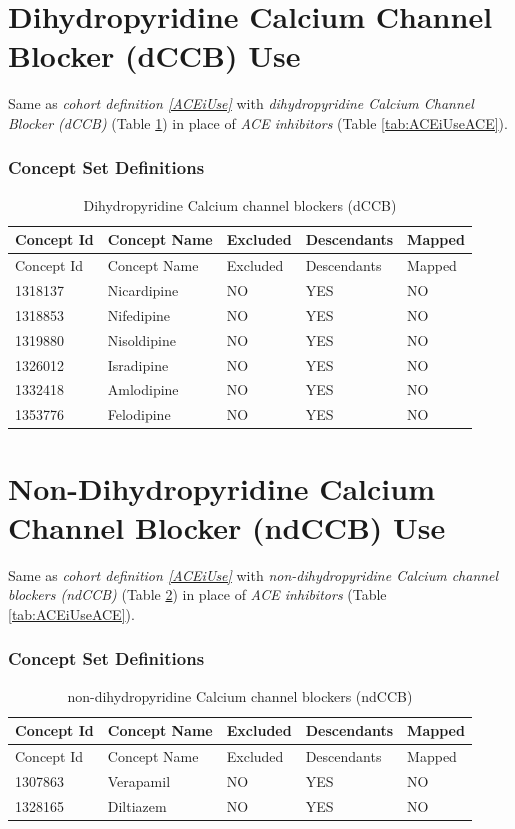 \documentclass[10.5pt]{book}
\theoremstyle{definition}
\theoremstyle{definition}
\theoremstyle{definition}
\theoremstyle{remark}
\begin{document}
\section{Dihydropyridine Calcium Channel Blocker (dCCB)
Use}\label{dCCBUse}

Same as \emph{cohort definition \ref{ACEiUse}} with
\emph{dihydropyridine Calcium Channel Blocker (dCCB)} (Table
\ref{tab:dCCBUsedCBB}) in place of \emph{ACE inhibitors} (Table
\ref{tab:ACEiUseACE}).

\subsubsection*{Concept Set
Definitions}\label{concept-set-definitions-9}

\begin{longtable}[]{@{}lllll@{}}
\caption{\label{tab:dCCBUsedCBB} Dihydropyridine Calcium channel blockers
(dCCB)}\tabularnewline
\toprule
Concept Id & Concept Name & Excluded & Descendants &
Mapped\tabularnewline
\midrule
\endfirsthead
\toprule
Concept Id & Concept Name & Excluded & Descendants &
Mapped\tabularnewline
\midrule
\endhead
1318137 & Nicardipine & NO & YES & NO\tabularnewline
1318853 & Nifedipine & NO & YES & NO\tabularnewline
1319880 & Nisoldipine & NO & YES & NO\tabularnewline
1326012 & Isradipine & NO & YES & NO\tabularnewline
1332418 & Amlodipine & NO & YES & NO\tabularnewline
1353776 & Felodipine & NO & YES & NO\tabularnewline
\bottomrule
\end{longtable}

\section{Non-Dihydropyridine Calcium Channel Blocker (ndCCB)
Use}\label{ndCCBUse}

Same as \emph{cohort definition \ref{ACEiUse}} with
\emph{non-dihydropyridine Calcium channel blockers (ndCCB)} (Table
\ref{tab:ndCCBUsendCCB}) in place of \emph{ACE inhibitors} (Table
\ref{tab:ACEiUseACE}).

\subsubsection*{Concept Set
Definitions}\label{concept-set-definitions-10}

\begin{longtable}[]{@{}lllll@{}}
\caption{\label{tab:ndCCBUsendCCB} non-dihydropyridine Calcium channel
blockers (ndCCB)}\tabularnewline
\toprule
Concept Id & Concept Name & Excluded & Descendants &
Mapped\tabularnewline
\midrule
\endfirsthead
\toprule
Concept Id & Concept Name & Excluded & Descendants &
Mapped\tabularnewline
\midrule
\endhead
1307863 & Verapamil & NO & YES & NO\tabularnewline
1328165 & Diltiazem & NO & YES & NO\tabularnewline
\bottomrule
\end{longtable}
\end{document}
